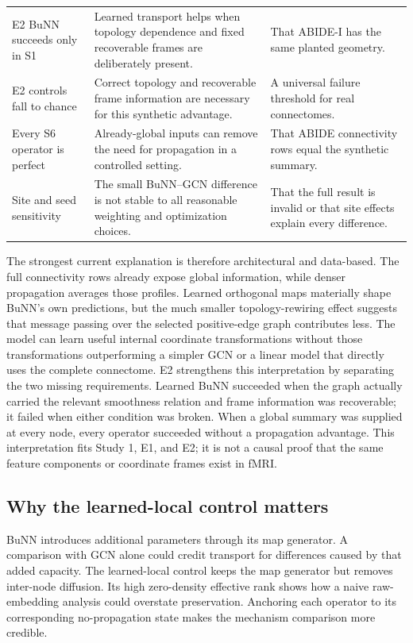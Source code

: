 \documentclass[11pt,a4paper]{article}
\begin{document}
\begin{table}[htbp]
\begin{tabularx}{\textwidth}{@{}p{3.1cm}Y Y@{}}
E2 BuNN succeeds only in S1 & Learned transport helps when topology dependence and fixed recoverable frames are deliberately present. & That ABIDE-I has the same planted geometry. \\
E2 controls fall to chance & Correct topology and recoverable frame information are necessary for this synthetic advantage. & A universal failure threshold for real connectomes. \\
Every S6 operator is perfect & Already-global inputs can remove the need for propagation in a controlled setting. & That ABIDE connectivity rows equal the synthetic summary. \\
Site and seed sensitivity & The small BuNN--GCN difference is not stable to all reasonable weighting and optimization choices. & That the full result is invalid or that site effects explain every difference. \\
\bottomrule
\end{tabularx}
\end{table}

The strongest current explanation is therefore architectural and data-based.
The full connectivity rows already expose global information, while denser
propagation averages those profiles. Learned orthogonal maps materially shape
BuNN's own predictions, but the much smaller topology-rewiring effect suggests
that message passing over the selected positive-edge graph contributes less.
The model can learn useful internal coordinate transformations without those
transformations outperforming a simpler GCN or a linear model that directly
uses the complete connectome. E2 strengthens this interpretation by separating
the two missing requirements. Learned BuNN succeeded when the graph actually
carried the relevant smoothness relation and frame information was recoverable;
it failed when either condition was broken. When a global summary was supplied
at every node, every operator succeeded without a propagation advantage. This
interpretation fits Study 1, E1, and E2; it is not a causal proof that the same
feature components or coordinate frames exist in fMRI.

\subsection{Why the learned-local control matters}

BuNN introduces additional parameters through its map generator. A comparison
with GCN alone could credit transport for differences caused by that added
capacity. The learned-local control keeps the map generator but removes
inter-node diffusion. Its high zero-density effective rank shows how a naive
raw-embedding analysis could overstate preservation. Anchoring each operator
to its corresponding no-propagation state makes the mechanism comparison more
credible.
\end{document}
